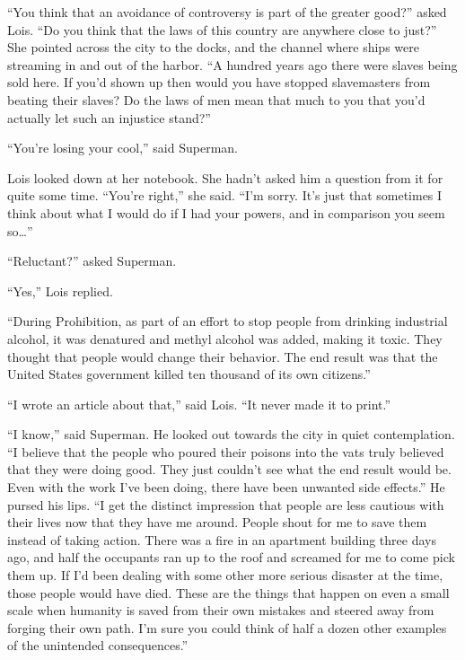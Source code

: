 ``You think that an avoidance of controversy is part of the greater
good?'' asked Lois. ``Do you think that the laws of this country are
anywhere close to just?'' She pointed across the city to the docks, and
the channel where ships were streaming in and out of the harbor. ``A
hundred years ago there were slaves being sold here. If you'd shown up
then would you have stopped slavemasters from beating their slaves? Do
the laws of men mean that much to you that you'd actually let such an
injustice stand?''

``You're losing your cool,'' said Superman.

Lois looked down at her notebook. She hadn't asked him a question from
it for quite some time. ``You're right,'' she said. ``I'm sorry. It's
just that sometimes I think about what I would do if I had your powers,
and in comparison you seem so\ldots{}''

``Reluctant?'' asked Superman.

``Yes,'' Lois replied.

``During Prohibition, as part of an effort to stop people from drinking
industrial alcohol, it was denatured and methyl alcohol was added,
making it toxic. They thought that people would change their behavior.
The end result was that the United States government killed ten thousand
of its own citizens.''

``I wrote an article about that,'' said Lois. ``It never made it to
print.''

``I know,'' said Superman. He looked out towards the city in quiet
contemplation. ``I believe that the people who poured their poisons into
the vats truly believed that they were doing good. They just couldn't
see what the end result would be. Even with the work I've been doing,
there have been unwanted side effects.'' He pursed his lips. ``I get the
distinct impression that people are less cautious with their lives now
that they have me around. People shout for me to save them instead of
taking action. There was a fire in an apartment building three days ago,
and half the occupants ran up to the roof and screamed for me to come
pick them up. If I'd been dealing with some other more serious disaster
at the time, those people would have died. These are the things that
happen on even a small scale when humanity is saved from their own
mistakes and steered away from forging their own path. I'm sure you
could think of half a dozen other examples of the unintended
consequences.''

